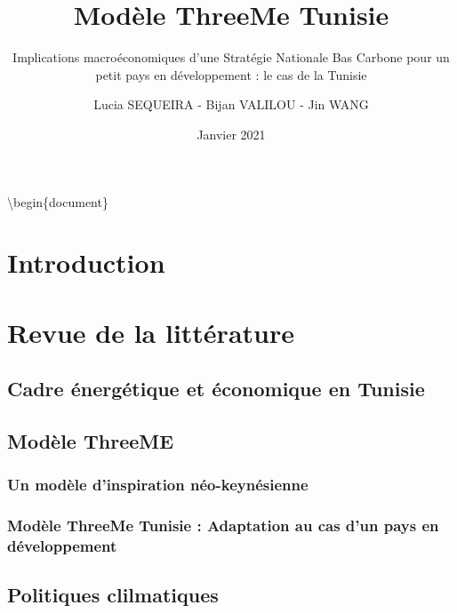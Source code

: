 \documentclass[
]{article}
\title{Modèle ThreeMe Tunisie}
\subtitle{Implications macroéconomiques d'une Stratégie Nationale Bas
Carbone pour un petit pays en développement : le cas de la Tunisie}
\author{Lucia SEQUEIRA - Bijan VALILOU - Jin WANG}
\date{Janvier 2021}
\begin{document}
\maketitle

{
\setcounter{tocdepth}{2}
\tableofcontents
}
\textbackslash begin\{document\}

\newpage

\hypertarget{introduction}{%
\section{Introduction}\label{introduction}}

\hypertarget{revue-de-la-littuxe9rature}{%
\section{Revue de la littérature}\label{revue-de-la-littuxe9rature}}

\hypertarget{cadre-uxe9nerguxe9tique-et-uxe9conomique-en-tunisie}{%
\subsection{Cadre énergétique et économique en
Tunisie}\label{cadre-uxe9nerguxe9tique-et-uxe9conomique-en-tunisie}}

\hypertarget{moduxe8le-threeme}{%
\subsection{Modèle ThreeME}\label{moduxe8le-threeme}}

\hypertarget{un-moduxe8le-dinspiration-nuxe9o-keynuxe9sienne}{%
\subsubsection{Un modèle d'inspiration
néo-keynésienne}\label{un-moduxe8le-dinspiration-nuxe9o-keynuxe9sienne}}

\hypertarget{moduxe8le-threeme-tunisie-adaptation-au-cas-dun-pays-en-duxe9veloppement}{%
\subsubsection{Modèle ThreeMe Tunisie : Adaptation au cas d'un pays en
développement}\label{moduxe8le-threeme-tunisie-adaptation-au-cas-dun-pays-en-duxe9veloppement}}

\hypertarget{politiques-clilmatiques}{%
\subsection{Politiques clilmatiques}\label{politiques-clilmatiques}}
\end{document}
